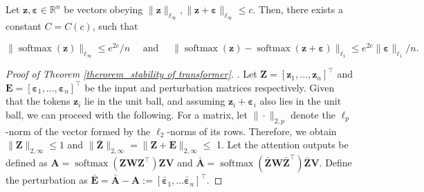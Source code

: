 \begin{lemma}\label{lemma_lisoftmax} Let $\boldsymbol{z}, \boldsymbol{\varepsilon} \in \mathbb{R}^n$ be vectors obeying $\|\boldsymbol{z}\|_{\ell_{\infty}},\|\boldsymbol{z}+\boldsymbol{\varepsilon}\|_{\ell_{\infty}} \leq c$. Then, there exists a constant $C=C(c)$, such that

$$
\|\operatorname{softmax}(\boldsymbol{z})\|_{\ell_{\infty}} \leq e^{2 c} / n \quad \text { and } \quad\|\operatorname{softmax}(\boldsymbol{z})-\operatorname{softmax}(\boldsymbol{z}+\boldsymbol{\varepsilon})\|_{\ell_1} \leq e^{2 c}\|\boldsymbol{\varepsilon}\|_{\ell_1} / n.
$$

\end{lemma}



\begin{proof}[Proof of Theorem \ref{therorem_stability of transformer}]. Let $\boldsymbol{Z}=\left[\boldsymbol{z}_1,  \ldots  ,\boldsymbol{z}_n\right]^{\top}$ and $\boldsymbol{E}=\left[\boldsymbol{\varepsilon}_1, \ldots , \boldsymbol{\varepsilon}_n\right]^{\top}$ be the input and perturbation matrices respectively. Given that the tokens $\boldsymbol{z}_i$ lie in the unit ball, and assuming $\boldsymbol{z}_i+\boldsymbol{\varepsilon}_i$ also lies in the unit ball, we can proceed with the following. For a matrix, let $\|\cdot\|_{2, p}$ denote the $\ell_p$-norm of the vector formed by the $\ell_2$-norms of its rows. Therefore, we obtain $\|\boldsymbol{Z}\|_{2, \infty} \leq 1$ and $\|\boldsymbol{\bar{Z}}\|_{2, \infty}=\|\boldsymbol{Z}+\boldsymbol{E}\|_{2, \infty} \leq$ 1. Let the attention outputs be defined as $\boldsymbol{A}=\operatorname{softmax}\left(\boldsymbol{Z} \boldsymbol{W} \boldsymbol{Z}^{\top}\right) \boldsymbol{Z} \boldsymbol{V}$ and $\bar{\boldsymbol{A}}=\operatorname{softmax}\left(\bar{\boldsymbol{Z}} \boldsymbol{W} \bar{\boldsymbol{Z}}^{\top}\right) \bar{\boldsymbol{Z}} \boldsymbol{V}$. Define the perturbation as $\bar{\boldsymbol{E}}=\bar{\boldsymbol{A}}-\boldsymbol{A}:=\left[\bar{\boldsymbol{\varepsilon}}_1, \ldots  \bar{\boldsymbol{\varepsilon}}_n\right]^{\top}$.


\end{proof}
